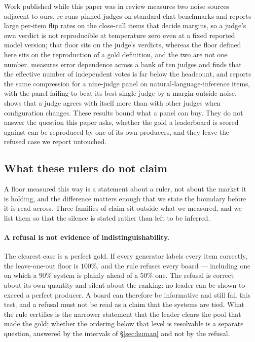 \documentclass{article}
\begin{document}
Work published while this paper was in review measures two noise sources adjacent to ours. \cite{ayyagari2026pinned} re-runs pinned judges on standard chat benchmarks and reports large per-item flip rates on the close-call items that decide margins, so a judge's own verdict is not reproducible at temperature zero even at a fixed reported model version; that floor sits on the judge's verdicts, whereas the floor defined here sits on the reproduction of a gold definition, and the two are not one number. \cite{hossain2026agreement} measures error dependence across a bank of ten judges and finds that the effective number of independent votes is far below the headcount, and \cite{kohli2026nine} reports the same compression for a nine-judge panel on natural-language-inference items, with the panel failing to beat its best single judge by a margin outside noise. \cite{kassler2026measuring} shows that a judge agrees with itself more than with other judges when configuration changes. These results bound what a panel can buy. They do not answer the question this paper asks, whether the gold a leaderboard is scored against can be reproduced by one of its own producers, and they leave the refused case we report untouched.

\subsection{What these rulers do not claim}
\label{sec:notclaim} A floor measured this way is a statement about a ruler, not about the market it is holding, and the difference matters enough that we state the boundary before it is read across. Three families of claim sit outside what we measured, and we list them so that the silence is stated rather than left to be inferred.

\paragraph{A refusal is not evidence of indistinguishability.} The clearest case is a perfect gold. If every generator labels every item correctly, the leave-one-out floor is $100\%$, and the rule refuses every board --- including one on which a $90\%$ system is plainly ahead of a $50\%$ one. The refusal is correct about its own quantity and silent about the ranking: no leader can be shown to exceed a perfect producer. A board can therefore be informative and still fail this test, and a refusal must not be read as a claim that the systems are tied. What the rule certifies is the narrower statement that the leader clears the pool that made the gold; whether the ordering below that level is resolvable is a separate question, answered by the intervals of \S\ref{sec:human} and not by the refusal.
\end{document}
